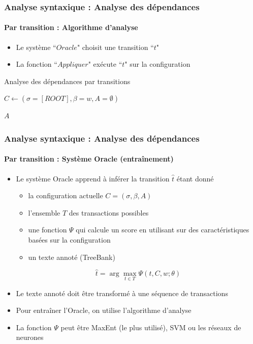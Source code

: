 \documentclass[xcolor=table]{beamer}
\begin{document}
\begin{frame}
\frametitle{Analyse syntaxique : Analyse des dépendances}
\framesubtitle{Par transition : Algorithme d'analyse}

\begin{itemize}
	\item Le système ``$Oracle$" choisit une transition ``$t$"
	\item La fonction ``$Appliquer$" exécute ``$t$" sur la configuration
\end{itemize}

\begin{block}{Analyse des dépendances par transitions}
	\begin{algorithm}[H]
		
		$C \leftarrow (\sigma=[ROOT], \beta = w, A = \emptyset)$\;
		
		
	
		\Retour $A$ \;
	\end{algorithm}
\end{block}

\end{frame}

\begin{frame}
\frametitle{Analyse syntaxique : Analyse des dépendances}
\framesubtitle{Par transition : Système Oracle (entraînement)}

\begin{itemize}
	\item Le système Oracle apprend à inférer la transition $\hat{t}$ étant donné
	\begin{itemize}
		\item la configuration actuelle $ C = (\sigma, \beta, A) $
		\item l'ensemble $T$ des transactions possibles
		\item une fonction $\Psi$ qui calcule un score en utilisant sur des caractéristiques basées sur la configuration 
		\item un texte annoté (TreeBank)
	\end{itemize}
	\[ \hat{t} = \arg\max\limits_{t \in T} \Psi (t, C, w; \theta) \]
	
	\item Le texte annoté doit être transformé à une séquence de transactions
	\item Pour entraîner l'Oracle, on utilise l'algorithme d'analyse 
	\item La fonction $\Psi$ peut être MaxEnt (le plus utilisé), SVM ou les réseaux de neurones
\end{itemize}

\end{frame}
\end{document}
